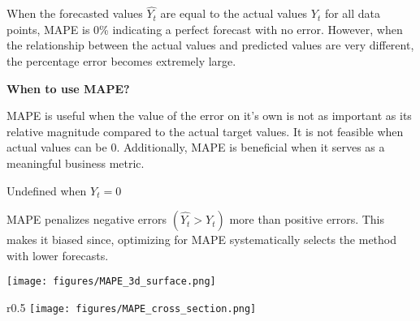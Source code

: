 \begin{center}
\end{center}

When the forecasted values $\hat{Y_{t}}$ are equal to the actual values $Y_{t}$ for all data points, MAPE is 0\% indicating a perfect forecast with no error.
However, when the relationship between the actual values and predicted values are very different, the percentage error becomes extremely large.

\textbf{When to use MAPE?}

MAPE is useful when the value of the error on it's own is not as important as its relative magnitude compared to the actual target values.
It is not feasible when actual values can be 0. Additionally, MAPE is beneficial when it serves as a meaningful business metric.

{
    \item Undefined when $Y_{t} = 0$
    \item MAPE penalizes negative errors $(\hat{Y_{t}} > Y_{t})$ more than positive errors. This makes it biased since, optimizing for MAPE systematically selects the method with lower forecasts.
}

\clearpage

\thispagestyle{customstyle}

\begin{figure*}[ht!]
    \centering
    \texttt{[image: figures/MAPE\_3d\_surface.png]}
\end{figure*}

\begin{wrapfigure}{r}{0.5\textwidth}
    \centering
    \vspace{-10pt} %
    \texttt{[image: figures/MAPE\_cross\_section.png]} %
    \vspace{-10pt} %
\end{wrapfigure}


